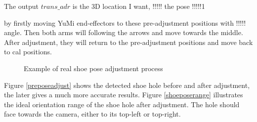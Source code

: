 The output $trans\_adr$ is the 3D location I want, !!!!! the pose !!!!!1

by firstly moving YuMi end-effectors to these pre-adjustment positions with  !!!!! angle. Then both arms will following the arrows and move towards the middle. After adjustment, they will return to the pre-adjustment positions and move back to cal positions.

\begin{figure}[H]
\centering
{}
\caption{Example of real shoe pose adjustment process}
\end{figure}

Figure \ref{preposeadjust} shows the detected shoe hole before and after adjustment, the later gives a much more accurate results. Figure \ref{shoeposerange} illustrates the ideal orientation range of the shoe hole after adjustment. The hole should face towards the camera, either to its top-left or top-right.

